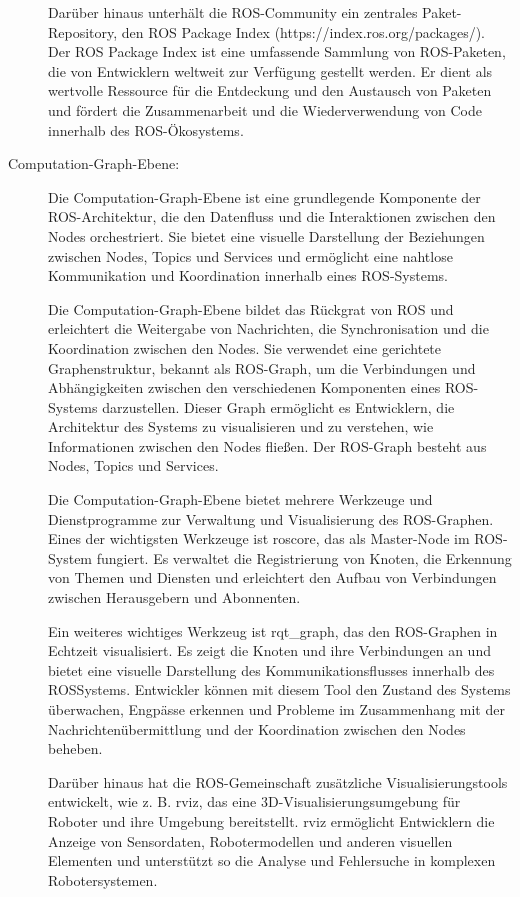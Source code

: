 \begin{description}
    Darüber hinaus unterhält die \ac{ROS}-Community ein zentrales Paket-Repository, den \ac{ROS} Package Index (https://index.ros.org/packages/). Der \ac{ROS} Package Index ist eine umfassende Sammlung von \ac{ROS}-Paketen, die von Entwicklern weltweit zur Verfügung gestellt werden. Er dient als wertvolle Ressource für die Entdeckung und den Austausch von Paketen und fördert die Zusammenarbeit und die Wiederverwendung von Code innerhalb des \ac{ROS}-Ökosystems.
    \cite[vgl.][]{filesystem}
    
    
    \item[Computation-Graph-Ebene:] Die Computation-Graph-Ebene ist eine grundlegende Komponente der \ac{ROS}-Architektur, die den Datenfluss und die Interaktionen zwischen den Nodes orchestriert. Sie bietet eine visuelle Darstellung der Beziehungen zwischen Nodes, Topics und Services und ermöglicht eine nahtlose Kommunikation und Koordination innerhalb eines \ac{ROS}-Systems.

    Die Computation-Graph-Ebene bildet das Rückgrat von \ac{ROS} und erleichtert die Weitergabe von Nachrichten, die Synchronisation und die Koordination zwischen den Nodes. Sie verwendet eine gerichtete Graphenstruktur, bekannt als ROS-Graph, um die Verbindungen und Abhängigkeiten zwischen den verschiedenen Komponenten eines \ac{ROS}-Systems darzustellen. Dieser Graph ermöglicht es Entwicklern, die Architektur des Systems zu visualisieren und zu verstehen, wie Informationen zwischen den Nodes fließen. Der ROS-Graph besteht aus Nodes, Topics und Services.
    
    Die Computation-Graph-Ebene bietet mehrere Werkzeuge und Dienstprogramme zur Verwaltung und Visualisierung des ROS-Graphen. Eines der wichtigsten Werkzeuge ist roscore, das als Master-Node im ROS-System fungiert. Es verwaltet die Registrierung von Knoten, die Erkennung von Themen und Diensten und erleichtert den Aufbau von Verbindungen zwischen Herausgebern und Abonnenten.
    
    Ein weiteres wichtiges Werkzeug ist rqt\_graph, das den ROS-Graphen in Echtzeit visualisiert. Es zeigt die Knoten und ihre Verbindungen an und bietet eine visuelle Darstellung des Kommunikationsflusses innerhalb des \ac{ROS}Systems. Entwickler können mit diesem Tool den Zustand des Systems überwachen, Engpässe erkennen und Probleme im Zusammenhang mit der Nachrichtenübermittlung und der Koordination zwischen den Nodes beheben.
    
    Darüber hinaus hat die \ac{ROS}-Gemeinschaft zusätzliche Visualisierungstools entwickelt, wie z. B. rviz, das eine 3D-Visualisierungsumgebung für Roboter und ihre Umgebung bereitstellt. rviz ermöglicht Entwicklern die Anzeige von Sensordaten, Robotermodellen und anderen visuellen Elementen und unterstützt so die Analyse und Fehlersuche in komplexen Robotersystemen.
    \cite[vgl.][]{computationGraph}
    

\end{description}
